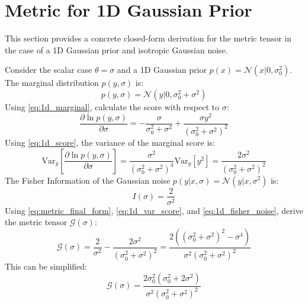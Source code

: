 \documentclass{article}
\begin{document}
\section{Metric for 1D Gaussian Prior}
This section provides a concrete closed-form derivation for the metric tensor in the case of a 1D Gaussian prior and isotropic Gaussian noise.

Consider the scalar case $\theta = \sigma$ and a 1D Gaussian prior $p(x) = \mathcal{N}(x|0, \sigma_0^2)$.
The marginal distribution $p(y, \sigma)$ is:
\begin{equation} \label{eq:1d_marginal}
    p(y, \sigma) = \mathcal{N}(y|0, \sigma_0^2 + \sigma^2)
\end{equation}
Using \eqref{eq:1d_marginal}, calculate the score with respect to $\sigma$:
\begin{equation} \label{eq:1d_score}
    \frac{\partial \ln p(y, \sigma)}{\partial \sigma} = -\frac{\sigma}{\sigma_0^2 + \sigma^2} + \frac{\sigma y^2}{(\sigma_0^2 + \sigma^2)^2}
\end{equation}
Using \eqref{eq:1d_score}, the variance of the marginal score is:
\begin{equation} \label{eq:1d_var_score}
    \mathrm{Var}_y \left[ \frac{\partial \ln p(y, \sigma)}{\partial \sigma} \right] = \frac{\sigma^2}{(\sigma_0^2 + \sigma^2)^4} \mathrm{Var}_y[y^2] = \frac{2\sigma^2}{(\sigma_0^2 + \sigma^2)^2}
\end{equation}
The Fisher Information of the Gaussian noise $p(y|x, \sigma) = \mathcal{N}(y|x, \sigma^2)$ is:
\begin{equation} \label{eq:1d_fisher_noise}
    I(\sigma) = \frac{2}{\sigma^2}
\end{equation}
Using \eqref{eq:metric_final_form}, \eqref{eq:1d_var_score}, and \eqref{eq:1d_fisher_noise}, derive the metric tensor $\mathcal{G}(\sigma)$:
\begin{equation} \label{eq:1d_metric_final}
    \mathcal{G}(\sigma) = \frac{2}{\sigma^2} - \frac{2\sigma^2}{(\sigma_0^2 + \sigma^2)^2} = \frac{2((\sigma_0^2 + \sigma^2)^2 - \sigma^4)}{\sigma^2 (\sigma_0^2 + \sigma^2)^2}
\end{equation}
This can be simplified:
\begin{equation} \label{eq:1d_metric_simplified}
    \mathcal{G}(\sigma) = \frac{2\sigma_0^2 ( \sigma_0^2 + 2\sigma^2 )}{\sigma^2 (\sigma_0^2 + \sigma^2)^2}
\end{equation}
\end{document}
